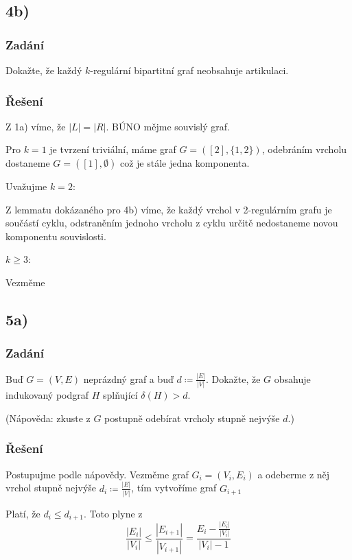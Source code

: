 \documentclass[../main.tex]{subfiles}
\begin{document}
\subsection{4b)}
\subsubsection*{Zadání}
Dokažte, že každý $k$-regulární bipartitní graf neobsahuje artikulaci.

\subsubsection*{Řešení}

Z 1a) víme, že  $|L|=|R|$. BÚNO mějme souvislý graf. 

Pro $k=1$ je tvrzení triviální, máme graf $G=([2], \{1,2\})$, odebráním vrcholu dostaneme $G=([1], \emptyset)$ což je stále jedna komponenta.

Uvažujme $k=2$: 

Z lemmatu dokázaného pro 4b) víme, že každý vrchol v 2-regulárním grafu je součástí cyklu, 
odstraněním jednoho vrcholu z cyklu určitě nedostaneme novou komponentu souvislosti.

$k\geq 3$:

Vezměme 




\subsection{5a)}
\subsubsection*{Zadání}
Buď $G=(V,E)$ neprázdný graf a buď $d \coloneq \frac{|E|}{|V|}$. 
Dokažte, že $G$ obsahuje indukovaný podgraf $H$ splňující $\delta(H) > d$.

(Nápověda: zkuste z $G$ postupně odebírat vrcholy stupně nejvýše $d$.)

\subsubsection*{Řešení}

Postupujme podle nápovědy. Vezměme graf $G_i = (V_i, E_i)$ a 
odeberme z něj vrchol stupně nejvýše $d_i \coloneq \frac{|E|}{|V|}$, tím vytvoříme graf $G_{i+1}$

Platí, že $d_i \leq d_{i+1}$. Toto plyne z 
\begin{equation*}
    \frac{|E_i|}{|V_i|} \leq \frac{|E_{i+1}|}{|V_{i+1}|} = \frac{E_{i} - \frac{|E_i|}{|V_i|}}{|V_i| - 1} 
\end{equation*}
\end{document}
